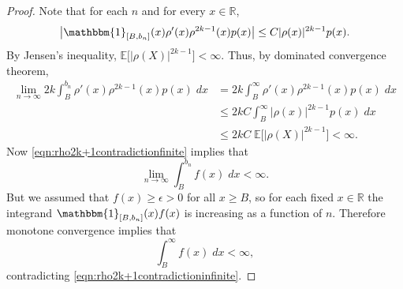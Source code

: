 \documentclass[10pt,a4paper]{amsart}
\newcommand{\E}{\mathbb{E}}
\newcommand{\R}{\mathbb{R}}
\newcommand{\ind}{\mathbbm{1}}
\begin{document}
\begin{proof}
		Note that for each $n$ and for every $x\in\R$,
		\begin{equation*}
			\big|\ind_{[B, b_n]}(x)\rho'(x) \rho^{2k-1}(x)p(x)\big|
			\leq C |\rho(x)|^{2k-1}p(x).
		\end{equation*}
		By Jensen's inequality, $\E\big[|\rho(X)|^{2k-1}\big]< \infty$. Thus, by dominated convergence theorem,
		\begin{align*}
			\lim_{n \to \infty} 2k \int_B^{b_n} \rho'(x) \rho^{2k-1}(x) p(x)\;dx &= 2k \int_B^{\infty} \rho'(x) \rho^{2k-1}(x) p(x)\;dx\\
			&\leq 2kC \int_B^{\infty} |\rho(x)|^{2k-1} p(x)\;dx\\
			&\leq 2kC \;\E\big[|\rho(X)|^{2k-1}\big]< \infty.
		\end{align*}
		Now \eqref{eqn:rho2k+1contradictionfinite} implies that \begin{equation*}
			\lim_{n\to\infty} \int_B^{b_n}  f(x)\; dx < \infty.
		\end{equation*}
		But we assumed that $f(x) \geq \epsilon > 0$ for all $x\geq B$, so for each fixed $x\in\R$ the integrand $\ind_{[B,b_n]}(x) f(x) $ is increasing as a function of $n$. Therefore monotone convergence implies that \begin{equation*}
			\int_B^{\infty}  f(x)\; dx < \infty,
		\end{equation*}
		contradicting \eqref{eqn:rho2k+1contradictioninfinite}.
	\end{proof}
\end{document}
